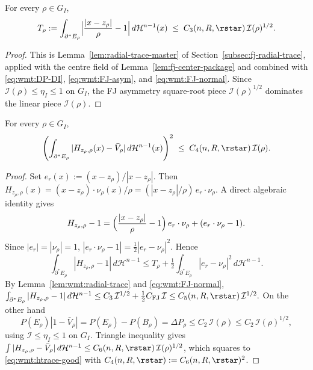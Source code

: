 \begin{lemma}
\label{lem:wmt:radial-trace}
For every $\rho\in G_I$,
\begin{equation}\label{eq:wmt:radial-trace}
   T_\rho:=\int_{\partial^*E_\rho}
      \Bigl|\frac{|x-z_\rho|}{\rho}-1\Bigr|\,d\mathcal H^{n-1}(x)
   \;\le\; C_3(n,R,\rstar)\,\mathcal I(\rho)^{1/2}.
\end{equation}
\end{lemma}

\begin{proof}
This is Lemma~\ref{lem:radial-trace-master} of
Section~\ref{subsec:fj-radial-trace}, applied with the centre field of
Lemma~\ref{lem:fj-center-package} and combined with
\eqref{eq:wmt:DP-DI}, \eqref{eq:wmt:FJ-asym}, and
\eqref{eq:wmt:FJ-normal}. Since $\mathcal I(\rho)\le\eta_I\le 1$ on
$G_I$, the FJ asymmetry square-root piece $\mathcal I(\rho)^{1/2}$
dominates the linear piece $\mathcal I(\rho)$.
\end{proof}

\begin{lemma}\label{lem:wmt:good-htrace}
For every $\rho\in G_I$,
\begin{equation}\label{eq:wmt:htrace-good}
   \Biggl(\int_{\partial^*E_\rho}
       |H_{z_\rho,\rho}(x)-\bar V_\rho|\,
       d\mathcal H^{n-1}(x)\Biggr)^2
   \;\le\; C_4(n,R,\rstar)\,\mathcal I(\rho).
\end{equation}
\end{lemma}

\begin{proof}
Set $e_r(x):=(x-z_\rho)/|x-z_\rho|$. Then
$H_{z_\rho,\rho}(x)
   =(x-z_\rho)\cdot\nu_\rho(x)/\rho
   =(|x-z_\rho|/\rho)\,e_r\cdot\nu_\rho$.
A direct algebraic identity gives
\[
   H_{z_\rho,\rho}-1
   =\Bigl(\frac{|x-z_\rho|}{\rho}-1\Bigr)\,e_r\cdot\nu_\rho
     +(e_r\cdot\nu_\rho-1).
\]
Since $|e_r|=|\nu_\rho|=1$, $|e_r\cdot\nu_\rho-1|
=\tfrac12|e_r-\nu_\rho|^2$. Hence
\[
   \int_{\partial^*E_\rho}|H_{z_\rho,\rho}-1|\,d\mathcal H^{n-1}
   \le T_\rho+\tfrac12\int_{\partial^*E_\rho}|e_r-\nu_\rho|^2\,
       d\mathcal H^{n-1}.
\]
By Lemma~\ref{lem:wmt:radial-trace} and \eqref{eq:wmt:FJ-normal},
\(
   \int_{\partial^*E_\rho}|H_{z_\rho,\rho}-1|\,d\mathcal H^{n-1}
   \le C_3\,\mathcal I^{1/2}+\tfrac12 C_{\mathrm{FJ}}\,\mathcal I
   \le C_5(n,R,\rstar)\,\mathcal I^{1/2}.
\)
On the other hand
\[
   P(E_\rho)|1-\bar V_\rho|
   =P(E_\rho)-P(B_\rho)
   =\Delta P_\rho
   \le C_2\,\mathcal I(\rho)
   \le C_2\,\mathcal I(\rho)^{1/2},
\]
using $\mathcal I\le\eta_I\le 1$ on $G_I$. Triangle inequality gives
$\int|H_{z_\rho,\rho}-\bar V_\rho|\,d\mathcal H^{n-1}
\le C_6(n,R,\rstar)\,\mathcal I(\rho)^{1/2}$, which squares to
\eqref{eq:wmt:htrace-good} with
$C_4(n,R,\rstar):=C_6(n,R,\rstar)^2$.
\end{proof}

